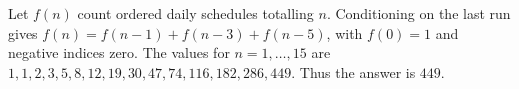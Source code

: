Let $f(n)$ count ordered daily schedules totalling $n$. Conditioning on the last run gives $f(n)=f(n-1)+f(n-3)+f(n-5)$, with $f(0)=1$ and negative indices zero. The values for $n=1,\ldots,15$ are $1,1,2,3,5,8,12,19,30,47,74,116,182,286,449$. Thus the answer is $\boxed{449}$.
